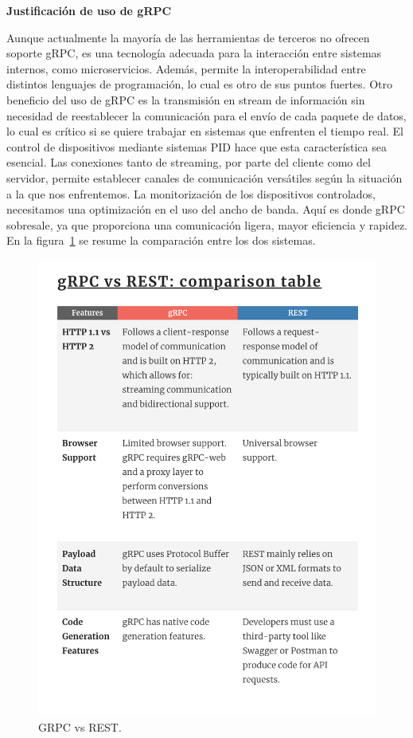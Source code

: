 \textbf{Justificación de uso de gRPC}

Aunque actualmente la mayoría de las herramientas de terceros no ofrecen soporte gRPC, es una tecnología adecuada para la interacción entre sistemas internos, como microservicios. Además, permite la interoperabilidad entre distintos lenguajes de programación, lo cual es otro de sus puntos fuertes. Otro beneficio del uso de gRPC es la transmisión en stream de información sin necesidad de reestablecer la comunicación para el envío de cada paquete de datos, lo cual es crítico si se quiere trabajar en sistemas que enfrenten el tiempo real. El control de dispositivos mediante sistemas PID hace que esta característica sea esencial. Las conexiones tanto de streaming, por parte del cliente como del servidor, permite establecer canales de comunicación versátiles según la situación a la que nos enfrentemos. La monitorización de los dispositivos controlados, necesitamos una optimización en el uso del ancho de banda. Aquí es donde gRPC sobresale, ya que proporciona una comunicación ligera, mayor eficiencia y rapidez. En la figura~\cref{fig:gRPC vs REST} se resume la comparación entre los dos sistemas.

\begin{figure}[H]
    \centering
    \includegraphics[height=0.4\textheight]{./part/Proyecto_ejecutivo/memoria_constructiva/rpc/img/rpcComparison}
    \caption{GRPC vs REST.\cite{berga_santos_2023}}\label{fig:gRPC vs REST}
\end{figure}